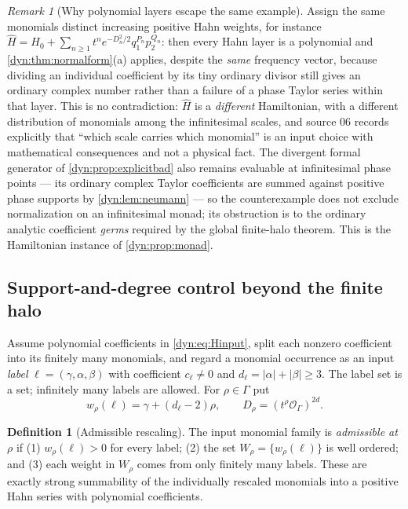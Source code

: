 \documentclass[11pt,letterpaper]{article}
\theoremstyle{definition}
\newtheorem{definition}[definition]{Definition}
\theoremstyle{remark}
\newtheorem{remark}[remark]{Remark}
\newcommand{\OO}{\mathcal O}
\numberwithin{equation}{section}
\begin{document}
\begin{remark}[Why polynomial layers escape the same example]
\label{dyn:rem:whypoly}
Assign the same monomials distinct increasing positive Hahn weights, for
instance
$\widehat H=H_0+\sum_{n\ge1}t^{n}e^{-D_n^{2}/2}q_1^{P_n}p_2^{Q_n}$: then
every Hahn layer is a polynomial and \cref{dyn:thm:normalform}(a) applies,
despite the \emph{same} frequency vector, because dividing an individual
coefficient by its tiny ordinary divisor still gives an ordinary complex
number rather than a failure of a phase Taylor series within that layer.
This is no contradiction: $\widehat H$ is a \emph{different} Hamiltonian,
with a different distribution of monomials among the infinitesimal scales,
and source 06 records explicitly that ``which scale carries which
monomial'' is an input choice with mathematical consequences and not a
physical fact. The divergent formal generator of
\cref{dyn:prop:explicitbad} also remains evaluable at infinitesimal phase
points --- its ordinary complex Taylor coefficients are summed against
positive phase supports by \cref{dyn:lem:neumann} --- so the counterexample
does not exclude normalization on an infinitesimal monad; its obstruction
is to the ordinary analytic coefficient \emph{germs} required by the global
finite-halo theorem. This is the Hamiltonian instance of
\cref{dyn:prop:monad}.
\end{remark}

\subsection{Support-and-degree control beyond the finite halo}
\label{dyn:subsec:domains}

Assume polynomial coefficients in \eqref{dyn:eq:Hinput}, split each nonzero
coefficient into its finitely many monomials, and regard a monomial
occurrence as an input \emph{label}
$\ell=(\gamma,\alpha,\beta)$ with coefficient $c_\ell\ne0$ and
$d_\ell=|\alpha|+|\beta|\ge3$. The label set is a set; infinitely many
labels are allowed. For $\rho\in\Gamma$ put
\begin{equation}\label{dyn:eq:weights}
 w_\rho(\ell)=\gamma+(d_\ell-2)\rho,\qquad
 D_\rho=(t^{\rho}\OO_\Gamma)^{2d} .
\end{equation}

\begin{definition}[Admissible rescaling]\label{dyn:def:admissible}
The input monomial family is \emph{admissible at $\rho$} if
(1) $w_\rho(\ell)>0$ for every label; (2) the set
$W_\rho=\{w_\rho(\ell)\}$ is well ordered; and (3) each weight in $W_\rho$
comes from only finitely many labels. These are exactly strong summability
of the individually rescaled monomials into a positive Hahn series with
polynomial coefficients.
\end{definition}
\end{document}
